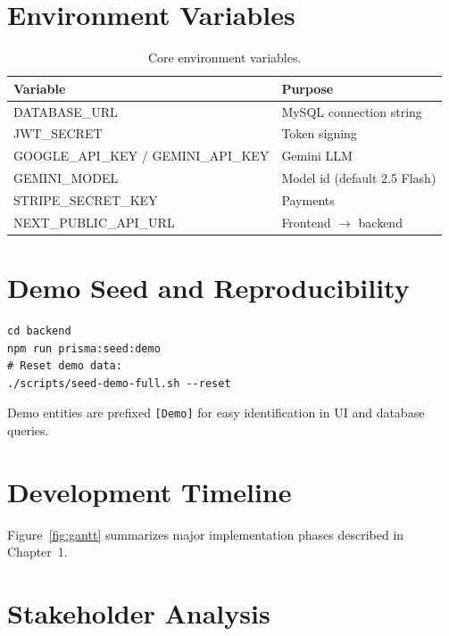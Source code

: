 \chapter{Environment Variables}
\label{app:env}

\begin{table}[htbp]
  \centering
  \caption{Core environment variables.}
  \label{tab:env-vars}
  \small
  \begin{tabular}{@{}lp{8.5cm}@{}}
    \toprule
    \textbf{Variable} & \textbf{Purpose} \\
    \midrule
    DATABASE\_URL & MySQL connection string \\
    JWT\_SECRET & Token signing \\
    GOOGLE\_API\_KEY / GEMINI\_API\_KEY & Gemini LLM \\
    GEMINI\_MODEL & Model id (default 2.5 Flash) \\
    STRIPE\_SECRET\_KEY & Payments \\
    NEXT\_PUBLIC\_API\_URL & Frontend $\rightarrow$ backend \\
    \bottomrule
  \end{tabular}
\end{table}

\chapter{Demo Seed and Reproducibility}
\label{app:seed}

\begin{verbatim}
cd backend
npm run prisma:seed:demo
# Reset demo data:
./scripts/seed-demo-full.sh --reset
\end{verbatim}

Demo entities are prefixed \texttt{[Demo]} for easy identification in UI and database queries.

\chapter{Development Timeline}
\label{app:timeline}

Figure~\ref{fig:gantt} summarizes major implementation phases described in Chapter~1.



\chapter{Stakeholder Analysis}
\label{app:stakeholders}

